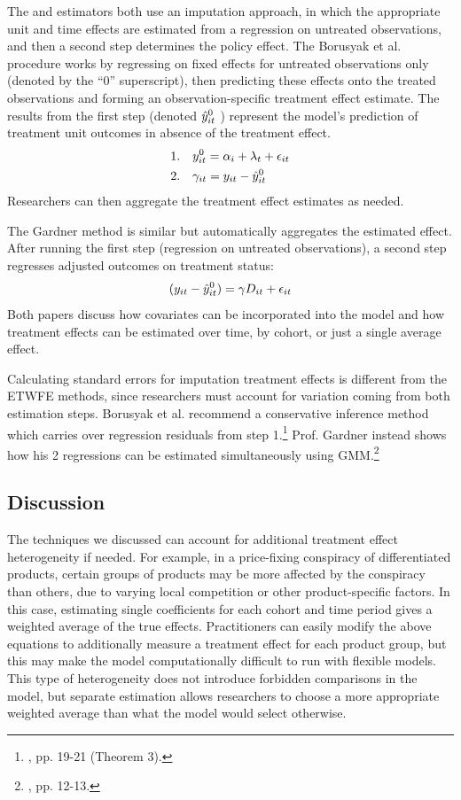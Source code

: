 \documentclass[12pt]{article}
\begin{document}
The \citet{borusyak2024revisiting} and \citet{gardner2022a} estimators both use an imputation approach, in which the appropriate unit and time effects are estimated from a regression on untreated observations, and then a second step determines the policy effect. The Borusyak et al. procedure works by regressing on fixed effects for untreated observations only (denoted by the “0” superscript), then predicting these effects onto the treated observations and forming an observation-specific treatment effect estimate. The results from the first step (denoted $\Hat{y}_{it}^0$ ) represent the model’s prediction of treatment unit outcomes in absence of the treatment effect.
\begin{align}
    1. \quad & y_{it}^0 = \alpha_i + \lambda_t + \epsilon_{it} \\
    2. \quad & \gamma_{it} = y_{it} - \Hat{y}_{it}^0
\end{align}
Researchers can then aggregate the treatment effect estimates as needed.

The Gardner method is similar but automatically aggregates the estimated effect. After running the first step (regression on untreated observations), a second step regresses adjusted outcomes on treatment status:
\begin{equation}
(y_{it} - \Hat{y}_{it}^0) = \gamma D_{it} + \epsilon_{it}    
\end{equation}
Both papers discuss how covariates can be incorporated into the model and how treatment effects can be estimated over time, by cohort, or just a single average effect.

Calculating standard errors for imputation treatment effects is different from the ETWFE methods, since researchers must account for variation coming from both estimation steps. Borusyak et al. recommend a conservative inference method which carries over regression residuals from step 1.\footnote{\citet{borusyak2024revisiting}, pp. 19-21 (Theorem 3).}  Prof. Gardner instead shows how his 2 regressions can be estimated simultaneously using GMM.\footnote{\citet{gardner2022a}, pp. 12-13.}
\subsection{Discussion}
The techniques we discussed can account for additional treatment effect heterogeneity if needed. For example, in a price-fixing conspiracy of differentiated products, certain groups of products may be more affected by the conspiracy than others, due to varying local competition or other product-specific factors. In this case, estimating single coefficients for each cohort and time period gives a weighted average of the true effects. Practitioners can easily modify the above equations to additionally measure a treatment effect for each product group, but this may make the model computationally difficult to run with flexible models. This type of heterogeneity does not introduce forbidden comparisons in the model, but separate estimation allows researchers to choose a more appropriate weighted average than what the model would select otherwise.
\end{document}
